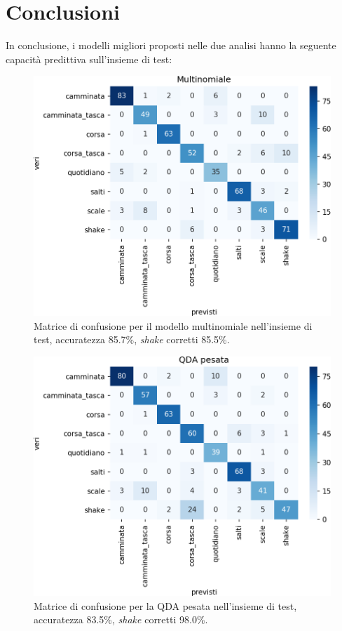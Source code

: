 \documentclass[main.tex]{subfiles}
\begin{document}
\section{Conclusioni}
In conclusione, i modelli migliori proposti nelle due analisi hanno la seguente capacità predittiva sull'insieme di test:\\
\begin{minipage}{0.45\textwidth}
\begin{figure}[H]
	\centering
	\includegraphics[width=\confusion]{../../figure/confusionMatrix-Mn-test.png}
	\caption{Matrice di confusione per il modello multinomiale nell'insieme di test, accuratezza 85.7\%, {\em shake} corretti 85.5\%.}
	\label{fig:mn-test}
\end{figure}
\end{minipage}
\hfill
\begin{minipage}{0.45\textwidth}
\begin{figure}[H]
	\centering
	\includegraphics[width=\confusion]{../../figure/confusionMatrix-QDA-penalizzata-test.png}
	\caption{Matrice di confusione per la QDA pesata nell'insieme di test, accuratezza 83.5\%, {\em shake} corretti 98.0\%.}
	\label{fig:qda-test}
\end{figure}
\end{minipage}
\end{document}
